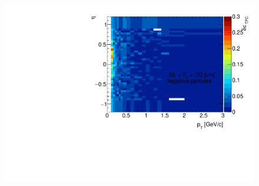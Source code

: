 \begin{figure}[H]
{		\includegraphics[width=\linewidth,page=31]{graphics/systematicsEfficiency/deadMaterial/secondaries_Unbinned_Charged_CD.pdf}\\
	}%
\end{figure}

